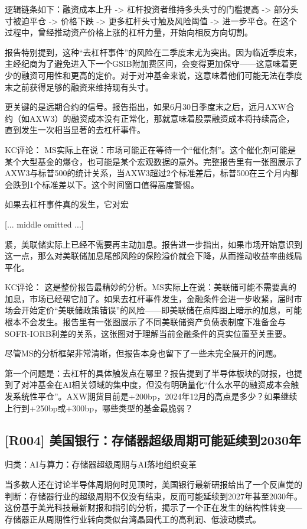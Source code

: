 \documentclass[11pt]{ctexart}
\begin{document}
逻辑链条如下：融资成本上升 -> 杠杆投资者维持多头头寸的门槛提高 -> 部分头寸被迫平仓 -> 价格下跌 -> 更多杠杆头寸触及风险阈值 -> 进一步平仓。在这个过程中，曾经推动资产价格上涨的杠杆力量，开始向相反方向切割。

报告特别提到，这种“去杠杆事件”的风险在二季度末尤为突出。因为临近季度末，主经纪商为了避免进入下一个GSIB附加费区间，会变得更加保守——这意味着更少的融资可用性和更高的定价。对于对冲基金来说，这意味着他们可能无法在季度末之前获得足够的融资来维持现有头寸。

更关键的是远期合约的信号。报告指出，如果6月30日季度末之后，远月AXW合约（如AXW3）的融资成本没有正常化，那就意味着股票融资成本将持续高企，直到发生一次相当显著的去杠杆事件。

KC评论： MS实际上在说：市场可能正在等待一个“催化剂”。这个催化剂可能是某个大型基金的爆仓，也可能是某个宏观数据的意外。完整报告里有一张图展示了AXW3与标普500的统计关系，当AXW3超过2个标准差后，标普500在三个月内都会跌到1个标准差以下。这个时间窗口值得高度警惕。

如果去杠杆事件真的发生，它对宏

[... middle omitted ...]

紧，美联储实际上已经不需要再主动加息。报告进一步指出，如果市场开始意识到这一点，那么对美联储加息尾部风险的保险溢价就会下降，从而推动收益率曲线扁平化。

KC评论： 这是整份报告最精妙的分析。MS实际上在说：美联储可能不需要真的加息，市场已经帮它加了。如果去杠杆事件发生，金融条件会进一步收紧，届时市场会开始定价“美联储政策错误”的风险——即美联储在点阵图上暗示的加息，可能根本不会发生。报告里有一张图展示了不同美联储资产负债表制度下准备金与SOFR-IORB利差的关系，这张图对于理解当前金融条件的真实位置至关重要。

尽管MS的分析框架非常清晰，但报告本身也留下了一些未完全展开的问题。

第一个问题是：去杠杆的具体触发点在哪里？报告提到了半导体板块的财报，也提到了对冲基金在AI相关领域的集中度，但没有明确量化“什么水平的融资成本会触发系统性平仓”。AXW期货目前是+200bp，2024年12月的高点是多少？如果继续上行到+250bp或+300bp，哪些类型的基金最脆弱？

\subsection{[R004] 美国银行：存储器超级周期可能延续到2030年}
{\small\color{refgray}归类：AI与算力：存储器超级周期与AI落地组织变革}

当多数人还在讨论半导体周期何时见顶时，美国银行最新研报给出了一个反直觉的判断：存储器行业的超级周期不仅没有结束，反而可能延续到2027年甚至2030年。这份基于美光科技最新财报和指引的分析，揭示了一个正在发生的结构性转变——存储器正从周期性行业转向类似台湾晶圆代工的高利润、低波动模式。
\end{document}
